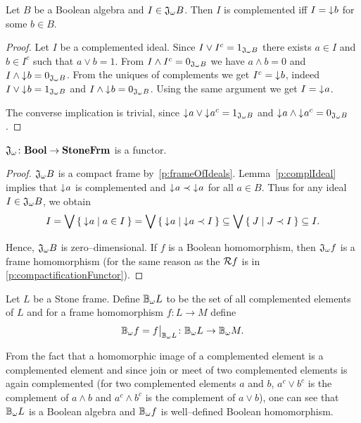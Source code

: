 \begin{lemma}\label{p:complIdeal}
    Let $B$ be a Boolean algebra and $I \in \mathfrak{J}_{\omega} B$. Then $I$ is complemented iff $I = \mathord{\downarrow}\mkern1mu b$ for some $b \in B$.
\end{lemma}
\begin{proof}
    Let $I$ be a complemented ideal. Since $I \vee I^c = 1_{\mathfrak{J}_{\omega} B}$ there exists $a \in I$ and $b \in I^c$ such that $a \vee b = 1$. From $I \wedge I^c = 0_{\mathfrak{J}_{\omega} B}$ we have $a \wedge b = 0$ and $I \wedge \mathord{\downarrow}\mkern1mu b = 0_{\mathfrak{J}_{\omega} B}$.
    From the uniques of complements we get $I^c = \mathord{\downarrow}\mkern1mu b$, indeed $I \vee \mathord{\downarrow}\mkern1mu b = 1_{\mathfrak{J}_{\omega} B}$ and $I \wedge \mathord{\downarrow}\mkern1mu b = 0_{\mathfrak{J}_{\omega} B}$. Using the same argument we get $I = \mathord{\downarrow}\mkern1mu a$.

    The converse implication is trivial, since $\mathord{\downarrow}\mkern1mu a \vee \mathord{\downarrow}\mkern1mu a^c = 1_{\mathfrak{J}_{\omega} B}$ and $\mathord{\downarrow}\mkern1mu a \wedge \mathord{\downarrow}\mkern1mu a^c = 0_{\mathfrak{J}_{\omega} B}$.
\end{proof}

\begin{proposition}\label{p:JisFunctor}
    $\mathfrak{J}_{\omega}\colon \mathbf{Bool} \to \mathbf{StoneFrm}$ is a functor.
\end{proposition}
\begin{proof}
    $\mathfrak{J}_{\omega} B$ is a compact frame by~\ref{p:frameOfIdeals}. Lemma~\ref{p:complIdeal} implies that $\mathord{\downarrow}\mkern1mu a$ is complemented and $\mathord{\downarrow}\mkern1mu a \prec \mathord{\downarrow}\mkern1mu a$ for all $a \in B$. Thus for any ideal $I \in \mathfrak{J}_{\omega} B$, we obtain
    $$ I = \bigvee \Set{ \mathord{\downarrow}\mkern1mua | a \in I } = \bigvee \Set{ \mathord{\downarrow}\mkern1mua | \mathord{\downarrow}\mkern1mua \prec I } \subseteq \bigvee \Set{ J | J \prec I } \subseteq I.$$

\noindent Hence, $\mathfrak{J}_{\omega} B$ is zero--dimensional. If $f$ is a Boolean homomorphism, then $\mathfrak{J}_{\omega} f$ is a frame homomorphism (for the same reason as the $\mathcal{R} f$ is in \ref{p:compactificationFunctor}).
\end{proof}

\begin{definition}
    Let $L$ be a Stone frame. Define $\DEFSYM{BcO}{$\BcO{}$} L$ to be the set of all complemented elements of $L$ and for a frame homomorphism $f\colon L \to M$ define
    $$\BcO f = \restr{f}{\BcO L}\colon \BcO L \to \BcO M.$$
\end{definition}

From the fact that a homomorphic image of a complemented element is a complemented element and since join or meet of two complemented elements is again complemented (for two complemented elements $a$ and $b$, $a^c \vee b^c$ is the complement of $a\wedge b$ and $a^c\wedge b^c$ is the complement of $a\vee b$), one can see that $\mathbb{B}_{\omega} L$ is a Boolean algebra and $\mathbb{B}_{\omega} f$ is well--defined Boolean homomorphism.

